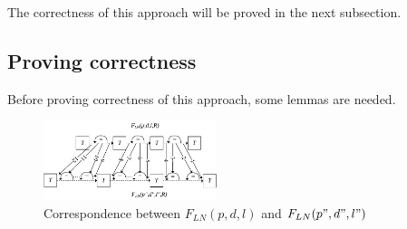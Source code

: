 \documentclass[journal]{IEEEtran}
\begin{document}
The correctness of this approach will be proved in the next subsection.




\subsection{Proving correctness}

Before proving correctness of this approach,
some lemmas are needed.
\begin{figure}[b]
\centering
\includegraphics[width=0.45\textwidth]{doubleloop_unfold_cmp}
\caption{Correspondence between $F_{LN}(p,d,l)$ and $F_{LN}(p",d",l")$}
\label{doubleloop_unfold_cmp}
\end{figure}
\end{document}
